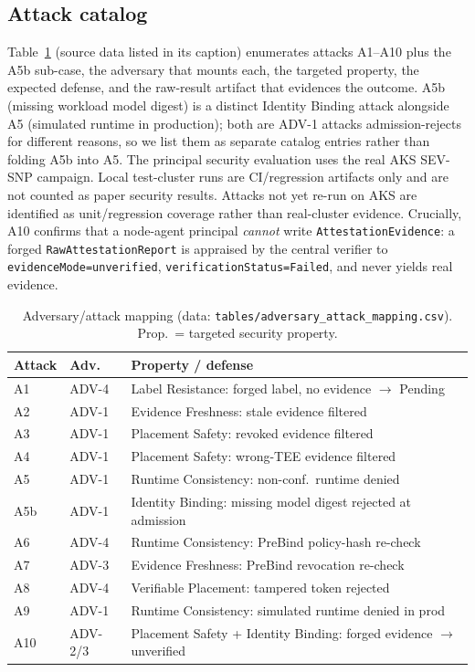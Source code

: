 \subsection{Attack catalog}
Table~\ref{tab:adversary} (source data listed in its caption) enumerates
attacks A1--A10 plus the A5b sub-case, the adversary that mounts each, the
targeted property, the expected defense, and the raw-result artifact that
evidences the outcome. A5b (missing workload model digest) is a distinct
Identity Binding attack alongside A5 (simulated runtime in production); both
are ADV-1 attacks admission-rejects for different reasons, so we list them as
separate catalog entries rather than folding A5b into A5.
The principal security evaluation uses the real AKS SEV-SNP campaign. Local
test-cluster runs are CI/regression artifacts only and are not counted as paper
security results. Attacks not yet re-run on AKS are identified as unit/regression
coverage rather than real-cluster evidence.
Crucially, A10 confirms that a node-agent principal \emph{cannot} write
\texttt{AttestationEvidence}: a forged \texttt{RawAttestationReport} is appraised
by the central verifier to \texttt{evidenceMode=unverified},
\texttt{verificationStatus=Failed}, and never yields real evidence.

\begin{table}[t]
  \centering
  \caption{Adversary/attack mapping (data:
  \texttt{tables/adversary\_attack\_mapping.csv}). Prop.\ = targeted security
  property.}
  \label{tab:adversary}
  \footnotesize
  \begin{tabular}{@{}llp{3.4cm}@{}}
    \toprule
    \textbf{Attack} & \textbf{Adv.} & \textbf{Property / defense} \\
    \midrule
    A1 & ADV-4 & Label Resistance: forged label, no evidence $\to$ Pending \\
    A2 & ADV-1 & Evidence Freshness: stale evidence filtered \\
    A3 & ADV-1 & Placement Safety: revoked evidence filtered \\
    A4 & ADV-1 & Placement Safety: wrong-TEE evidence filtered \\
    A5 & ADV-1 & Runtime Consistency: non-conf.\ runtime denied \\
    A5b & ADV-1 & Identity Binding: missing model digest rejected at admission \\
    A6 & ADV-4 & Runtime Consistency: PreBind policy-hash re-check \\
    A7 & ADV-3 & Evidence Freshness: PreBind revocation re-check \\
    A8 & ADV-4 & Verifiable Placement: tampered token rejected \\
    A9 & ADV-1 & Runtime Consistency: simulated runtime denied in prod \\
    A10 & ADV-2/3 & Placement Safety + Identity Binding: forged evidence $\to$ unverified \\
    \bottomrule
  \end{tabular}
\end{table}

